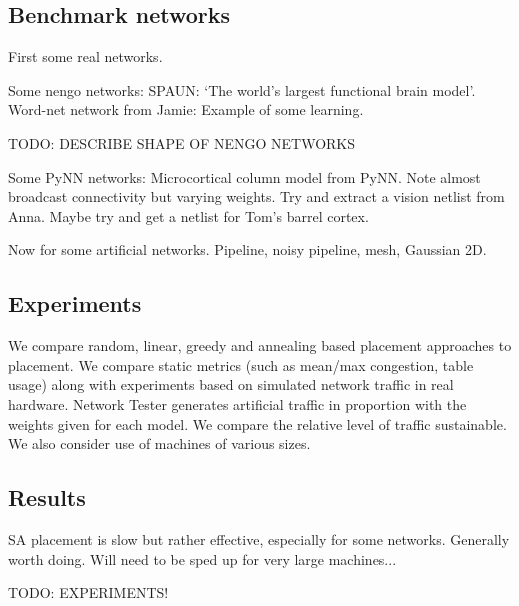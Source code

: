 		\subsection{Benchmark networks}
			
			First some real networks.
			
			Some nengo networks: SPAUN: `The world's largest functional brain model'.
			Word-net network from Jamie: Example of some learning.
			
			TODO: DESCRIBE SHAPE OF NENGO NETWORKS
			
			Some PyNN networks: Microcortical column model from PyNN. Note almost
			broadcast connectivity but varying weights. Try and extract a vision
			netlist from Anna. Maybe try and get a netlist for Tom's barrel cortex.
			
			Now for some artificial networks. Pipeline, noisy pipeline, mesh,
			Gaussian 2D.
		
		\subsection{Experiments}
			
			We compare random, linear, greedy and annealing based placement
			approaches to placement. We compare static metrics (such as mean/max
			congestion, table usage) along with experiments based on simulated
			network traffic in real hardware. Network Tester generates artificial
			traffic in proportion with the weights given for each model. We compare
			the relative level of traffic sustainable. We also consider use of
			machines of various sizes.
		
		\subsection{Results}
			
			SA placement is slow but rather effective, especially for some networks.
			Generally worth doing. Will need to be sped up for very large machines...
			
			TODO: EXPERIMENTS!
	
